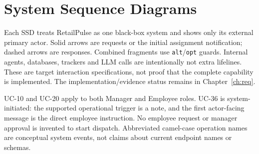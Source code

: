 \section{System Sequence Diagrams}
\label{sec:ssds}
Each SSD treats RetailPulse as one black-box system and shows only its external primary actor. Solid arrows are requests or the initial assignment notification; dashed arrows are responses. Combined fragments use \texttt{alt}/\texttt{opt} guards. Internal agents, databases, trackers and LLM calls are intentionally not extra lifelines. These are target interaction specifications, not proof that the complete capability is implemented. The implementation/evidence status remains in Chapter~\ref{ch:req}.

UC-10 and UC-20 apply to both Manager and Employee roles. UC-36 is system-initiated: the supported operational trigger is a note, and the first actor-facing message is the direct employee instruction. No employee request or manager approval is invented to start dispatch. Abbreviated camel-case operation names are conceptual system events, not claims about current endpoint names or schemas.

\clearpage
